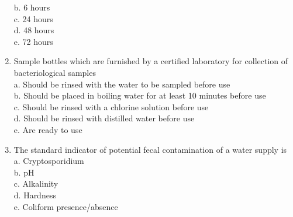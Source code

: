 \documentclass{article}
\begin{document}
\begin{enumerate}[1.]
b. 6 hours\\
c. 24 hours\\
d. 48 hours\\
e. 72 hours\\
  \item Sample bottles which are furnished by a certified laboratory for collection of bacteriological samples\\
a. Should be rinsed with the water to be sampled before use\\
b. Should be placed in boiling water for at least 10 minutes before use\\
c. Should be rinsed with a chlorine solution before use\\
d. Should be rinsed with distilled water before use\\
e. Are ready to use\\

\item The standard indicator of potential fecal contamination of a water supply is\\
a. Cryptosporidium\\
b. $\mathrm{pH}$\\
c. Alkalinity\\
d. Hardness\\
e. Coliform presence/absence\\


\end{enumerate}
\end{document}
